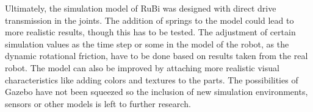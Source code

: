 Ultimately, the simulation model of RuBi was designed with direct drive transmission in the joints.
The addition of springs to the model could lead to more realistic results, though this has to be tested.
The adjustment of certain simulation values as the time step or some in the model of the robot, as the dynamic rotational friction, have to be done based on results taken from the real robot.
The model can also be improved by attaching more realistic visual characteristics like adding colors and textures to the parts.
The possibilities of Gazebo have not been squeezed so the inclusion of new simulation environments, sensors or other models is left to further research.

